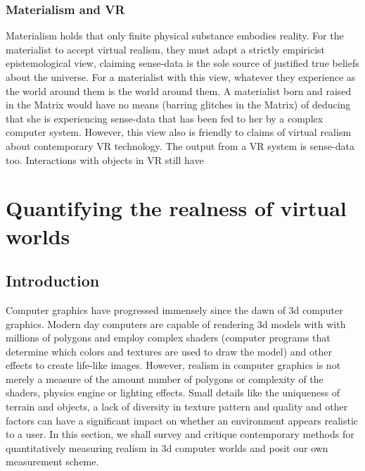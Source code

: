  \subsection{Materialism and VR}
Materialism holds that only finite physical substance embodies reality. For the materialist to accept virtual realism, they must adapt a strictly empiricist epistemological view, claiming sense-data is the sole source of justified true beliefs about the universe. For a materialist with this view, whatever they experience as the world around them is the world around them. A materialist born and raised in the Matrix would have no means (barring glitches in the Matrix) of deducing that she is experiencing sense-data that has been fed to her by a complex computer system. However, this view also is friendly to claims of virtual realism about contemporary VR technology. The output from a VR system is sense-data too. Interactions with objects in VR still have
\chapter{Quantifying the realness of virtual worlds }\label{text}
\section{Introduction}


Computer graphics have progressed immensely since the dawn of 3d computer graphics. Modern day computers are capable of rendering 3d models with with millions of polygons and employ complex shaders (computer programs that determine which colors and textures are used to draw the model) and other effects to create life-like images. However, realism in computer graphics is not merely a measure of the amount number of polygons or complexity of the shaders, physics engine or lighting effects. Small details like the uniqueness of terrain and objects, a lack of diversity in texture pattern and quality and other factors can have a significant impact on whether an environment appears realistic to a user. In this section, we shall survey and critique contemporary methods for quantitatively measuring realism in 3d computer worlds and posit our own measurement scheme. 


